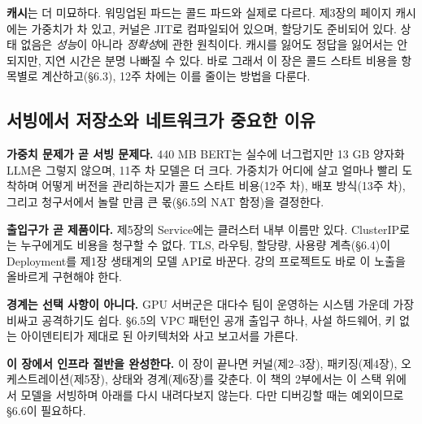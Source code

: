 \textbf{캐시}는 더 미묘하다. 워밍업된 파드는 콜드 파드와 실제로 다르다. 제3장의 페이지 캐시에는 가중치가 차 있고, 커널은 JIT로 컴파일되어 있으며, 할당기도 준비되어 있다. 상태 없음은 \textit{성능}이 아니라 \textit{정확성}에 관한 원칙이다. 캐시를 잃어도 정답을 잃어서는 안 되지만, 지연 시간은 분명 나빠질 수 있다. 바로 그래서 이 장은 콜드 스타트 비용을 항목별로 계산하고(§6.3), 12주 차에는 이를 줄이는 방법을 다룬다.

\subsection*{서빙에서 저장소와 네트워크가 중요한 이유}

\begin{tbbitemize}
  \item \textbf{가중치 문제가 곧 서빙 문제다.} 440 MB BERT는 실수에 너그럽지만 13 GB 양자화 LLM은 그렇지 않으며, 11주 차 모델은 더 크다. 가중치가 어디에 살고 얼마나 빨리 도착하며 어떻게 버전을 관리하는지가 콜드 스타트 비용(12주 차), 배포 방식(13주 차), 그리고 청구서에서 놀랄 만큼 큰 몫(§6.5의 NAT 함정)을 결정한다.
  \item \textbf{출입구가 곧 제품이다.} 제5장의 Service에는 클러스터 내부 이름만 있다. ClusterIP로는 누구에게도 비용을 청구할 수 없다. TLS, 라우팅, 할당량, 사용량 계측(§6.4)이 Deployment를 제1장 생태계의 모델 API로 바꾼다. 강의 프로젝트도 바로 이 노출을 올바르게 구현해야 한다.
  \item \textbf{경계는 선택 사항이 아니다.} GPU 서버군은 대다수 팀이 운영하는 시스템 가운데 가장 비싸고 공격하기도 쉽다. §6.5의 VPC 패턴인 공개 출입구 하나, 사설 하드웨어, 키 없는 아이덴티티가 제대로 된 아키텍처와 사고 보고서를 가른다.
  \item \textbf{이 장에서 인프라 절반을 완성한다.} 이 장이 끝나면 커널(제2–3장), 패키징(제4장), 오케스트레이션(제5장), 상태와 경계(제6장)를 갖춘다. 이 책의 2부에서는 이 스택 위에서 모델을 서빙하며 아래를 다시 내려다보지 않는다. 다만 디버깅할 때는 예외이므로 §6.6이 필요하다.
\end{tbbitemize}

